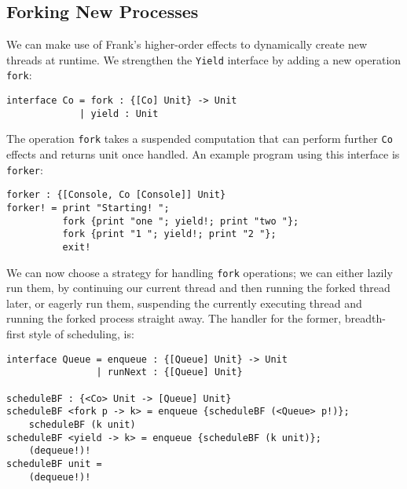 \documentclass[msc,deptreport,cs]{infthesis} %
\newcommand{\code}[1]{\lstinline{#1}}
\newcommand{\todo}[1]
           {{\par\noindent\small\color{RoyalPurple}
  \framebox{\parbox{\dimexpr\linewidth-2\fboxsep-2\fboxrule}
    {\textbf{TODO:} #1}}}}
\begin{document}


\subsection{Forking New Processes}
\label{subsec:forking-new-processes}

We can make use of Frank's higher-order effects to dynamically create new
threads at runtime. We strengthen the \code{Yield} interface by adding a new
operation \code{fork}:

\begin{lstlisting}
interface Co = fork : {[Co] Unit} -> Unit
             | yield : Unit
\end{lstlisting}

The operation \code{fork} takes a suspended computation that can perform further
\code{Co} effects and returns unit once handled. An example program using this
interface is \code{forker}:

\begin{lstlisting}
forker : {[Console, Co [Console]] Unit}
forker! = print "Starting! ";
          fork {print "one "; yield!; print "two "};
          fork {print "1 "; yield!; print "2 "};
          exit!
\end{lstlisting}

We can now choose a strategy for handling \code{fork} operations; we can either
lazily run them, by continuing our current thread and then running the forked
thread later, or eagerly run them, suspending the currently executing thread and
running the forked process straight away. The handler for the former,
breadth-first style of scheduling, is:

\begin{lstlisting}
interface Queue = enqueue : {[Queue] Unit} -> Unit
                | runNext : {[Queue] Unit}

scheduleBF : {<Co> Unit -> [Queue] Unit}
scheduleBF <fork p -> k> = enqueue {scheduleBF (<Queue> p!)};
    scheduleBF (k unit)
scheduleBF <yield -> k> = enqueue {scheduleBF (k unit)};
    (dequeue!)!
scheduleBF unit =
    (dequeue!)!
\end{lstlisting}
\end{document}
